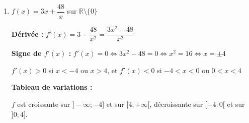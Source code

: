\documentclass[1,DS,p,e,prof]{phBook}
\begin{document}
\begin{exercice}
\begin{correction}
\begin{enumerate}
            $f$ est décroissante sur $]-\infty;2[$ et sur $]2;+\infty[$.
            
            \item $f(x)=3x+\dfrac{48}{x}$ sur $\mathbb{R}\setminus\{0\}$
            
            \textbf{Dérivée :} $f'(x)=3-\dfrac{48}{x^2}=\dfrac{3x^2-48}{x^2}$
            
            \textbf{Signe de $f'(x)$ :} $f'(x)=0 \Leftrightarrow 3x^2-48=0 \Leftrightarrow x^2=16 \Leftrightarrow x=\pm 4$
            
            $f'(x)>0$ si $x<-4$ ou $x>4$, et $f'(x)<0$ si $-4<x<0$ ou $0<x<4$
            
            \textbf{Tableau de variations :}
            \begin{center}
            \end{center}
            
            $f$ est croissante sur $]-\infty;-4]$ et sur $[4;+\infty[$, décroissante sur $[-4;0[$ et sur $]0;4]$.
        \end{enumerate}
    \end{correction}
\end{exercice}
\end{document}
